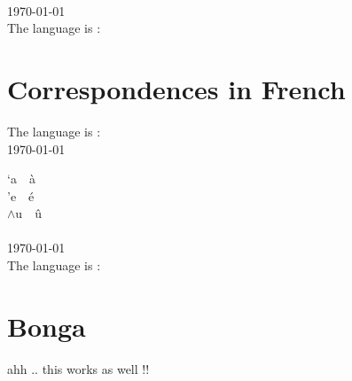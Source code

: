\documentclass{article}
\begin{document}
\\
\today\\
The language is : 

\section{Correspondences in French}
The language is : \\
\today\\
\newcommand{\LS}[1]{`#1~~\`#1}
\newcommand{\RS}[1]{'#1~~\'#1}
\newcommand{\HAT}[1]{$\wedge$#1~~\^#1}

\LS{a}\\
\RS{e}\\
\HAT{u}\\

\\
\today\\
The language is : 

\appendix

\section{Bonga}
ahh .. this works as well !!

\printindex
\end{document}
